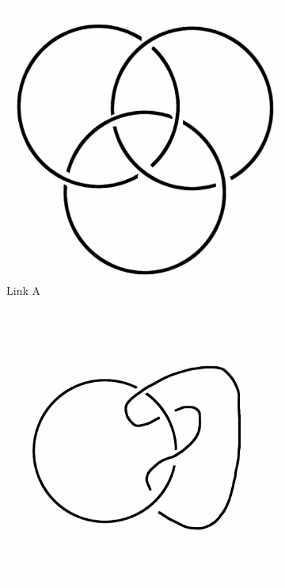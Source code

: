 \documentclass[12pt,letterpaper]{article}
\theoremstyle{definition}
\begin{document}
\begin{figure}[h!]
    \centering
    \begin{subfigure}{.3\textwidth}
        \centering
        \includegraphics[width=\textwidth]{rgp10pics/borromean.png}
        \caption{Link A}
    \end{subfigure}
    \hspace{.5cm}
    \begin{subfigure}{.3\textwidth}
        \centering
        \includegraphics[width=\textwidth]{rgp11pics/lno2.png}

\end{subfigure}
\end{figure}
\end{document}

